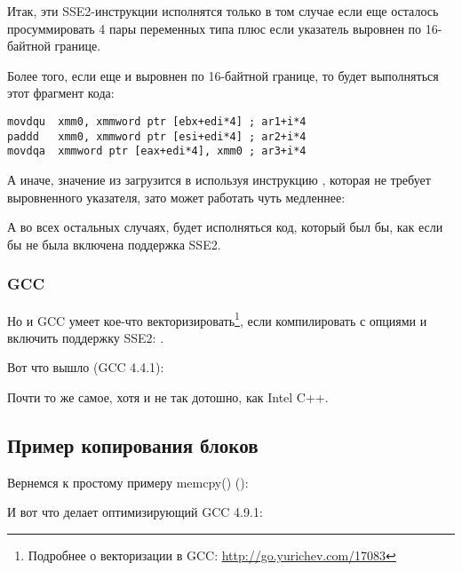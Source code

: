 Итак, эти SSE2-инструкции исполнятся только в том случае если еще осталось просуммировать 
4 пары переменных типа \Tint плюс если указатель  выровнен по 16-байтной границе.

Более того, если еще и  выровнен по 16-байтной границе, 
то будет выполняться этот фрагмент кода:

\begin{lstlisting}
movdqu  xmm0, xmmword ptr [ebx+edi*4] ; ar1+i*4
paddd   xmm0, xmmword ptr [esi+edi*4] ; ar2+i*4
movdqa  xmmword ptr [eax+edi*4], xmm0 ; ar3+i*4
\end{lstlisting}

А иначе, значение из  загрузится в  используя инструкцию \MOVDQU, 
которая не требует выровненного указателя, зато может работать чуть медленнее:



А во всех остальных случаях, будет исполняться код, который был бы, как если бы не была 
включена поддержка SSE2.

\subsubsection{GCC}

\newcommand{\URLGCCVEC}{\url{http://go.yurichev.com/17083}}

Но и GCC умеет кое-что векторизировать\footnote{Подробнее о векторизации в GCC: \URLGCCVEC}, 
если компилировать с опциями \Othree и включить поддержку SSE2: .

Вот что вышло (GCC 4.4.1):



Почти то же самое, хотя и не так дотошно, как Intel C++.

\subsection{Пример копирования блоков}
\label{vec_memcpy}

Вернемся к простому примеру memcpy() ():



И вот что делает оптимизирующий GCC 4.9.1:


